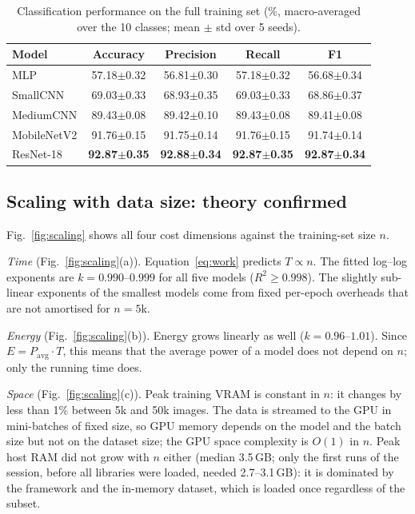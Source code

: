 \documentclass[conference]{IEEEtran}
\begin{document}
\begin{table}[t]
\centering
\caption{Classification performance on the full training set (\%, macro-averaged over the 10 classes; mean $\pm$ std over 5 seeds).}
\label{tab:metrics}
\setlength{\tabcolsep}{3pt}
\begin{tabular}{lcccc}
\toprule
Model & Accuracy & Precision & Recall & F1 \\
\midrule
MLP         & 57.18$\pm$0.32 & 56.81$\pm$0.30 & 57.18$\pm$0.32 & 56.68$\pm$0.34 \\
SmallCNN    & 69.03$\pm$0.33 & 68.93$\pm$0.35 & 69.03$\pm$0.33 & 68.86$\pm$0.37 \\
MediumCNN   & 89.43$\pm$0.08 & 89.42$\pm$0.10 & 89.43$\pm$0.08 & 89.41$\pm$0.08 \\
MobileNetV2 & 91.76$\pm$0.15 & 91.75$\pm$0.14 & 91.76$\pm$0.15 & 91.74$\pm$0.14 \\
ResNet-18   & \textbf{92.87$\pm$0.35} & \textbf{92.88$\pm$0.34} & \textbf{92.87$\pm$0.35} & \textbf{92.87$\pm$0.34} \\
\bottomrule
\end{tabular}
\end{table}

\subsection{Scaling with data size: theory confirmed}
Fig.~\ref{fig:scaling} shows all four cost dimensions against the training-set size $n$.

\emph{Time} (Fig.~\ref{fig:scaling}(a)). Equation~\eqref{eq:work} predicts $T\propto n$. The fitted log--log exponents are $k=0.990$--$0.999$ for all five models ($R^2\geq0.998$). The slightly sub-linear exponents of the smallest models come from fixed per-epoch overheads that are not amortised for $n=5$k.

\emph{Energy} (Fig.~\ref{fig:scaling}(b)). Energy grows linearly as well ($k=0.96$--$1.01$). Since $E=P_{\mathrm{avg}}\cdot T$, this means that the average power of a model does not depend on $n$; only the running time does.

\emph{Space} (Fig.~\ref{fig:scaling}(c)). Peak training VRAM is constant in $n$: it changes by less than 1\% between 5k and 50k images. The data is streamed to the GPU in mini-batches of fixed size, so GPU memory depends on the model and the batch size but not on the dataset size; the GPU space complexity is $O(1)$ in $n$. Peak host RAM did not grow with $n$ either (median 3.5\,GB; only the first runs of the session, before all libraries were loaded, needed 2.7--3.1\,GB): it is dominated by the framework and the in-memory dataset, which is loaded once regardless of the subset.
\end{document}
